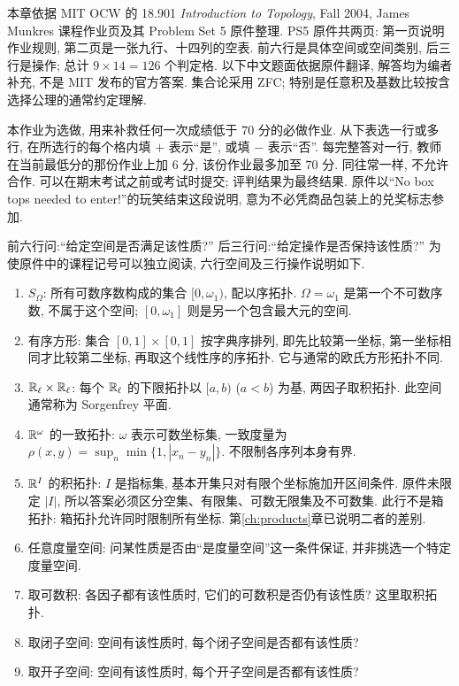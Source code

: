 \label{ch:official-topology-assignment}

本章依据 MIT OCW 的 18.901 \emph{Introduction to Topology}, Fall 2004, James Munkres 课程作业页及其 Problem Set 5 原件整理. PS5 原件共两页: 第一页说明作业规则, 第二页是一张九行、十四列的空表. 前六行是具体空间或空间类别, 后三行是操作; 总计 $9\times14=126$ 个判定格. 以下中文题面依据原件翻译, 解答均为编者补充, 不是 MIT 发布的官方答案. 集合论采用 ZFC; 特别是任意积及基数比较按含选择公理的通常约定理解.

\begin{exercise}\label{ex:official-ps5}
本作业为选做, 用来补救任何一次成绩低于 $70$ 分的必做作业. 从下表选一行或多行, 在所选行的每个格内填 $+$ 表示“是”, 或填 $-$ 表示“否”. 每完整答对一行, 教师在当前最低分的那份作业上加 $6$ 分, 该份作业最多加至 $70$ 分. 同往常一样, 不允许合作. 可以在期末考试之前或考试时提交; 评判结果为最终结果. 原件以“No box tops needed to enter!”的玩笑结束这段说明, 意为不必凭商品包装上的兑奖标志参加.

前六行问:“给定空间是否满足该性质?” 后三行问:“给定操作是否保持该性质?” 为使原件中的课程记号可以独立阅读, 六行空间及三行操作说明如下.
\begin{enumerate}
\item $S_\Omega$: 所有可数序数构成的集合 $[0,\omega_1)$, 配以序拓扑. $\Omega=\omega_1$ 是第一个不可数序数, 不属于这个空间; $[0,\omega_1]$ 则是另一个包含最大元的空间.
\item 有序方形: 集合 $[0,1]\times[0,1]$ 按字典序排列, 即先比较第一坐标, 第一坐标相同才比较第二坐标, 再取这个线性序的序拓扑. 它与通常的欧氏方形拓扑不同.
\item $\mathbb R_\ell\times\mathbb R_\ell$: 每个 $\mathbb R_\ell$ 的下限拓扑以 $[a,b)$ ($a<b$) 为基, 两因子取积拓扑. 此空间通常称为 Sorgenfrey 平面.
\item $\mathbb R^\omega$ 的一致拓扑: $\omega$ 表示可数坐标集, 一致度量为 $\rho(x,y)=\sup_n\min\{1,|x_n-y_n|\}$. 不限制各序列本身有界.
\item $\mathbb R^I$ 的积拓扑: $I$ 是指标集, 基本开集只对有限个坐标施加开区间条件. 原件未限定 $|I|$, 所以答案必须区分空集、有限集、可数无限集及不可数集. 此行不是箱拓扑: 箱拓扑允许同时限制所有坐标. 第\ref{ch:products}章已说明二者的差别.
\item 任意度量空间: 问某性质是否由“是度量空间”这一条件保证, 并非挑选一个特定度量空间.
\item 取可数积: 各因子都有该性质时, 它们的可数积是否仍有该性质? 这里取积拓扑.
\item 取闭子空间: 空间有该性质时, 每个闭子空间是否都有该性质?
\item 取开子空间: 空间有该性质时, 每个开子空间是否都有该性质?
\end{enumerate}


\end{exercise}
